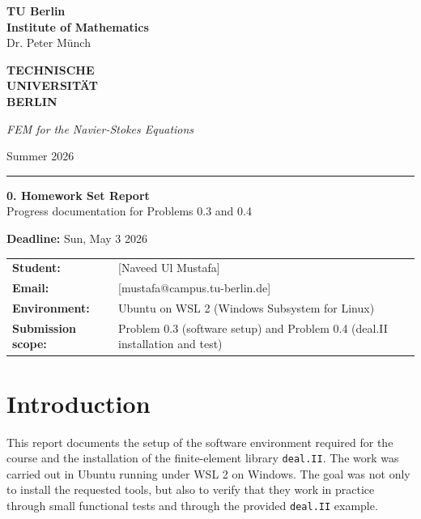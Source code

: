 \documentclass[11pt,a4paper]{article}
\makeatletter
\newcommand{\course}{FEM for the Navier-Stokes Equations}
\newcommand{\semester}{Summer 2026}
\newcommand{\professor}{Dr. Peter Münch}
\newcommand{\studentname}{[Naveed Ul Mustafa]}
\newcommand{\studentemail}{[mustafa@campus.tu-berlin.de]}
\newcommand{\deadline}{Sun, May 3 2026}
\makeatother
\begin{document}
\noindent
\begin{minipage}[t]{0.62\textwidth}
{\bfseries TU Berlin}\\
{\bfseries Institute of Mathematics}\\
\professor
\end{minipage}%
\begin{minipage}[t]{0.38\textwidth}
\raggedleft
{\color{accent}\bfseries TECHNISCHE}\\[-0.15em]
{\color{accent}\bfseries UNIVERSIT\"AT}\\[-0.15em]
{\color{accent}\bfseries BERLIN}
\end{minipage}

\vspace{1.2em}
\noindent
\begin{minipage}[t]{0.62\textwidth}
\textit{\course}
\end{minipage}%
\begin{minipage}[t]{0.38\textwidth}
\raggedleft \semester
\end{minipage}

\vspace{0.35em}
\hrule

\vspace{1.2em}
\begin{center}
    {\LARGE \bfseries 0. Homework Set Report}\\[0.4em]
    {\normalsize Progress documentation for Problems 0.3 and 0.4}
\end{center}

\vspace{0.6em}
\noindent \textbf{Deadline:} \deadline

\vspace{0.6em}
\noindent
\begin{tabular}{@{}p{}p{}@{}}
\textbf{Student:} & \studentname \\
\textbf{Email:} & \studentemail \\
\textbf{Environment:} & Ubuntu on WSL 2 (Windows Subsystem for Linux) \\
\textbf{Submission scope:} & Problem 0.3 (software setup) and Problem 0.4 (deal.II installation and test) \\
\end{tabular}

\section{Introduction}
This report documents the setup of the software environment required for the course and the installation of the finite-element library \texttt{deal.II}. The work was carried out in Ubuntu running under WSL 2 on Windows. The goal was not only to install the requested tools, but also to verify that they work in practice through small functional tests and through the provided \texttt{deal.II} example.
\end{document}
